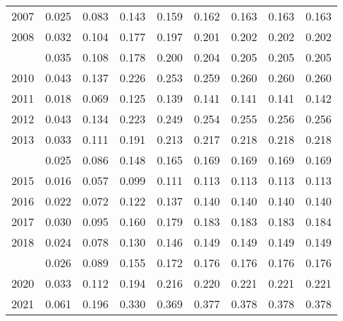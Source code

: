 \documentclass[
]{article}
\begin{document}
\begin{longtable}[t]{lrrrrrrrr}
2007 & 0.025 & 0.083 & 0.143 & 0.159 & 0.162 & 0.163 & 0.163 & 0.163\\
2008 & 0.032 & 0.104 & 0.177 & 0.197 & 0.201 & 0.202 & 0.202 & 0.202\\
\addlinespace
2009 & 0.035 & 0.108 & 0.178 & 0.200 & 0.204 & 0.205 & 0.205 & 0.205\\
2010 & 0.043 & 0.137 & 0.226 & 0.253 & 0.259 & 0.260 & 0.260 & 0.260\\
2011 & 0.018 & 0.069 & 0.125 & 0.139 & 0.141 & 0.141 & 0.141 & 0.142\\
2012 & 0.043 & 0.134 & 0.223 & 0.249 & 0.254 & 0.255 & 0.256 & 0.256\\
2013 & 0.033 & 0.111 & 0.191 & 0.213 & 0.217 & 0.218 & 0.218 & 0.218\\
\addlinespace
2014 & 0.025 & 0.086 & 0.148 & 0.165 & 0.169 & 0.169 & 0.169 & 0.169\\
2015 & 0.016 & 0.057 & 0.099 & 0.111 & 0.113 & 0.113 & 0.113 & 0.113\\
2016 & 0.022 & 0.072 & 0.122 & 0.137 & 0.140 & 0.140 & 0.140 & 0.140\\
2017 & 0.030 & 0.095 & 0.160 & 0.179 & 0.183 & 0.183 & 0.183 & 0.184\\
2018 & 0.024 & 0.078 & 0.130 & 0.146 & 0.149 & 0.149 & 0.149 & 0.149\\
\addlinespace
2019 & 0.026 & 0.089 & 0.155 & 0.172 & 0.176 & 0.176 & 0.176 & 0.176\\
2020 & 0.033 & 0.112 & 0.194 & 0.216 & 0.220 & 0.221 & 0.221 & 0.221\\
2021 & 0.061 & 0.196 & 0.330 & 0.369 & 0.377 & 0.378 & 0.378 & 0.378\\*
\end{longtable}
\end{document}

